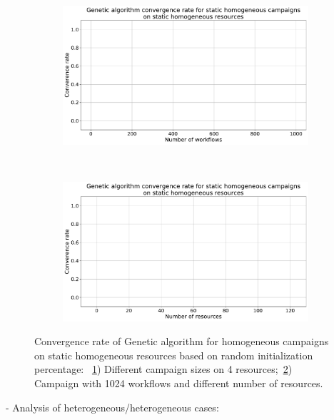 \begin{figure}[ht!]
    \centering
    \begin{subfigure}[b]{0.45\textwidth}
        \includegraphics[width=.95\textwidth]{figures/campaign/GAconv_StHomoCampaigns_4StHomoResources.pdf}
        \caption{}
        \label{fig:ga_conv1}
    \end{subfigure}%
    ~ 
    \begin{subfigure}[b]{0.45\textwidth}
        \includegraphics[width=\linewidth]{figures/campaign/GAconv_StHomoResources_StHomoCampaigns.pdf}
        \caption{}
        \label{fig:ga_conv2}
    \end{subfigure}
    \caption{Convergence rate of Genetic algorithm for homogeneous campaigns on static homogeneous resources based on random initialization percentage: ~\ref{fig:ga_conv1}) Different campaign sizes on 4 resources;~\ref{fig:ga_conv2}) Campaign with 1024 workflows and different number of resources.}
    \label{fig:conv_rate}
\end{figure}

- Analysis of heterogeneous/heterogeneous cases:


